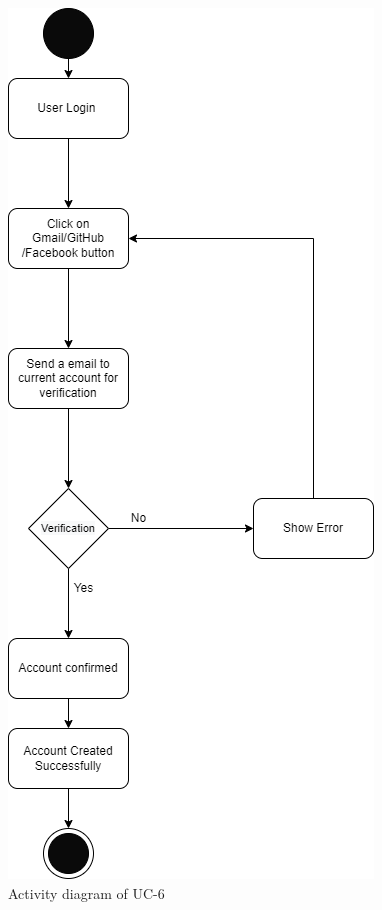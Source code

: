 \begin{figure}[H]
    \centering
    \includegraphics[scale=0.7]{./diagrams/Activity Diagram/ad-06.png}
    \caption{Activity diagram of UC-6}
    \label{fig:act-06}

\end{figure}


